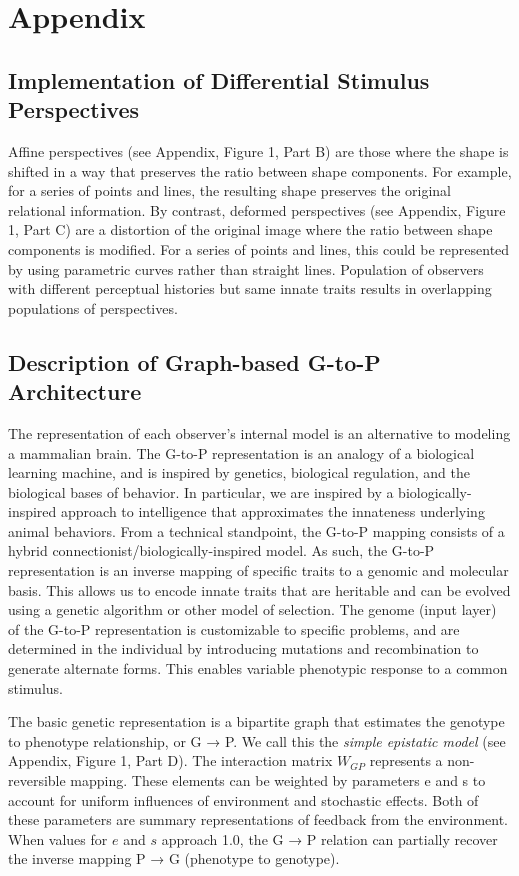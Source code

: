 \documentclass{article}
\begin{document}
\section*{Appendix}

\subsection*{Implementation of Differential Stimulus Perspectives}
Affine perspectives (see Appendix, Figure 1, Part B) are those where the shape is shifted in a way that preserves the ratio between shape components. For example, for a series of points and lines, the resulting shape preserves the original relational information. By contrast, deformed perspectives (see Appendix, Figure 1, Part C) are a distortion of the original image where the ratio between shape components is modified. For a series of points and lines, this could be represented by using parametric curves rather than straight lines. Population of observers with different perceptual histories but same innate traits results in overlapping populations of perspectives.

\subsection*{Description of Graph-based G-to-P Architecture}
The representation of each observer’s internal model is an alternative to modeling a mammalian brain. The G-to-P representation is an analogy of a biological learning machine, and is inspired by genetics, biological regulation, and the biological bases of behavior. In particular, we are inspired by a biologically-inspired approach to intelligence that approximates the innateness underlying animal behaviors. From a technical standpoint, the G-to-P mapping consists of a hybrid connectionist/biologically-inspired model. As such, the G-to-P representation is an inverse mapping of specific traits to a genomic and molecular basis. This allows us to encode innate traits that are heritable and can be evolved using a genetic algorithm or other model of selection. The genome (input layer) of the G-to-P representation is customizable to specific problems, and are determined in the individual by introducing mutations and recombination to generate alternate forms. This enables variable phenotypic response to a common stimulus.

The basic genetic representation is a bipartite graph that estimates the genotype to phenotype relationship, or G → P. We call this the {\it simple epistatic model} (see Appendix, Figure 1, Part D). The interaction matrix $W_{GP}$ represents a non-reversible mapping. These elements can be weighted by parameters e and s to account for uniform influences of environment and stochastic effects. Both of these parameters are summary representations of feedback from the environment. When values for $e$ and $s$ approach 1.0, the G → P relation can partially recover the inverse mapping P → G (phenotype to genotype). 
\end{document}
